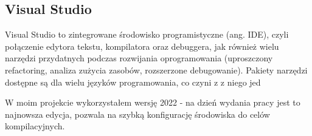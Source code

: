 \subsection{Visual Studio}

Visual Studio \cite{visualStudio} to zintegrowane środowisko programistyczne (ang. IDE), 
czyli połączenie edytora tekstu, kompilatora oraz debuggera, jak również wielu narzędzi przydatnych podczas rozwijania oprogramowania
(uproszczony refactoring, analiza zużycia zasobów, rozszerzone debugowanie). Pakiety narzędzi dostępne są dla wielu
języków programowania, co czyni z z niego jed

W moim projekcie wykorzystałem wersję 2022 - na dzień wydania pracy jest to najnowsza edycja,
pozwala na szybką konfigurację środowiska do celów kompilacyjnych.
